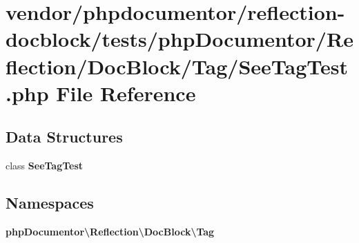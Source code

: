 \section{vendor/phpdocumentor/reflection-\/docblock/tests/php\+Documentor/\+Reflection/\+Doc\+Block/\+Tag/\+See\+Tag\+Test.php File Reference}
\label{_see_tag_test_8php}
\subsection*{Data Structures}
\begin{DoxyCompactItemize}
\item 
class {\bf See\+Tag\+Test}
\end{DoxyCompactItemize}
\subsection*{Namespaces}
\begin{DoxyCompactItemize}
\item 
 {\bf php\+Documentor\textbackslash{}\+Reflection\textbackslash{}\+Doc\+Block\textbackslash{}\+Tag}
\end{DoxyCompactItemize}

